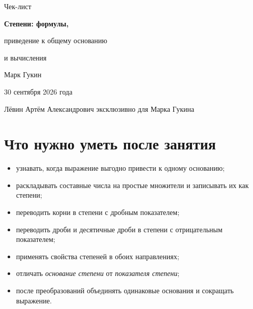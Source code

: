 \documentclass[a4paper,12pt]{article}
\begin{document}
\color{textgray}

\thispagestyle{empty}
\begin{center}
\vspace*{24mm}

{\Large\color{softgray}Чек-лист}\par
\vspace{7mm}
{\fontsize{27}{32}\selectfont\bfseries\color{darkaccent}Степени: формулы,\par приведение к общему основанию\par и вычисления}\par
\vspace{10mm}
{\large Марк Гукин}\par
\vspace{3mm}
{\normalsize 30 сентября 2026 года}\par

\vfill
{\small\color{softgray}Лёвин Артём Александрович эксклюзивно для Марка Гукина}\par
\vspace{10mm}

\end{center}
\clearpage

\section*{Что нужно уметь после занятия}

\begin{itemize}[label={\(\square\)}]
  \item узнавать, когда выражение выгодно привести к одному основанию;
  \item раскладывать составные числа на простые множители и записывать их как степени;
  \item переводить корни в степени с дробным показателем;
  \item переводить дроби и десятичные дроби в степени с отрицательным показателем;
  \item применять свойства степеней в обоих направлениях;
  \item отличать \emph{основание степени} от \emph{показателя степени};
  \item после преобразований объединять одинаковые основания и сокращать выражение.
\end{itemize}
\end{document}
